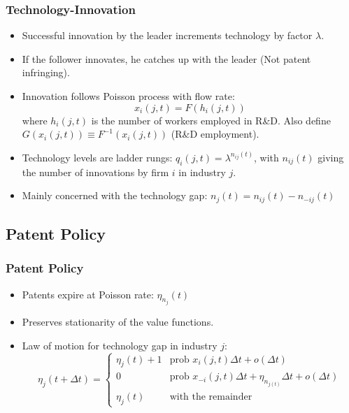 \documentclass{beamer}
\begin{document}
\begin{frame}[t]\frametitle{Technology-Innovation} 
  \begin{itemize}
    \item Successful innovation by the leader increments technology by factor $\lambda$.
    \item If the follower innovates, he catches up with the leader (Not patent infringing).
    \item Innovation follows Poisson process with flow rate:
      \begin{equation} \label{eq:tech_rd_technology}
        x_i(j, t) = F(h_i(j, t))
      \end{equation}
      where $h_i(j, t)$ is the number of workers employed in R\&D.
      Also define $G(x_i(j,t)) \equiv F^{-1}(x_i(j,t))$ (R\&D employment).
    \item Technology levels are ladder rungs: $q_i(j, t) = \lambda^{n_{ij}(t)}$, with $n_{ij}(t)$ giving the number of innovations by firm $i$ in industry $j$.
    \item Mainly concerned with the technology gap: $n_j(t) = n_{ij}(t) - n_{-ij}(t)$
  \end{itemize}
\end{frame}

\subsection{Patent Policy}
\label{sub:patent_policy}

\begin{frame}[t]\frametitle{Patent Policy}
  \begin{itemize}
    \item Patents expire at Poisson rate: $\eta_{n_j}(t)$
    \item Preserves stationarity of the value functions.
    \item Law of motion for technology gap in industry $j$:
      \begin{equation*} \label{eq:tech_law_of_motion}
        \eta_j(t + \Delta t) =
        \begin{cases}
          \eta_j(t) + 1 & \textrm{prob } x_i(j,t)\Delta t + o(\Delta t)\\
          0 & \textrm{prob } x_{-i}(j,t)\Delta t + \eta_{n_{j(t)}}\Delta t + o(\Delta t) \\
          \eta_j(t) & \textrm{with the remainder} 
        \end{cases}
      \end{equation*}
  \end{itemize}
\end{frame}
\end{document}
